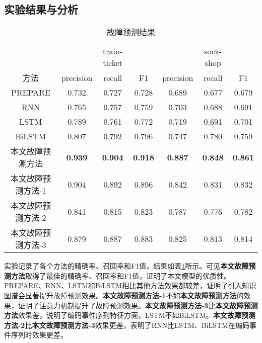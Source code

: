 \subsection{实验结果与分析}
\begin{table}[htbp]
    \caption{故障预测结果}
    \centering
    \label{anom-predict}
    \begin{tabular}{ccccccc}
    \toprule[2pt]
               &                & train-ticket   &                &                & sock-shop      &                \\
    方法         & precision      & recall         & F1             & precision      & recall         & F1             \\ \midrule[2pt]
    PREPARE    & 0.732          & 0.727          & 0.728          & 0.689          & 0.677          & 0.679          \\
    RNN        & 0.765          & 0.757          & 0.759          & 0.703          & 0.688          & 0.691          \\
    LSTM       & 0.789          & 0.761          & 0.772          & 0.719          & 0.691          & 0.701          \\
    BiLSTM     & 0.807          & 0.792          & 0.796          & 0.747          & 0.780          & 0.759          \\
    本文故障预测方法       & \textbf{0.939} & \textbf{0.904} & \textbf{0.918} & \textbf{0.887} & \textbf{0.848} & \textbf{0.861} \\
    本文故障预测方法-1 & 0.904          & 0.892          & 0.896          & 0.842          & 0.831          & 0.832          \\
    本文故障预测方法-2 & 0.841          & 0.815          & 0.823          & 0.787          & 0.776          & 0.782          \\
    本文故障预测方法-3 & 0.879          & 0.887          & 0.883          & 0.825          & 0.813          & 0.814          \\ \bottomrule[2pt]
    \end{tabular}
    \end{table}
实验记录了各个方法的精确率、召回率和F1值，结果如表\ref{anom-predict}所示。可见\textbf{本文故障预测方法}取得了最佳的精确率、召回率和F1值，证明了本文模型的优质性。PREPARE、RNN、LSTM和BiLSTM相比其他方法效果都较差，证明了引入知识图谱会显著提升故障预测效果。\textbf{本文故障预测方法-1}不如\textbf{本文故障预测方法}的效果，证明了注意力机制提升了故障预测效果。\textbf{本文故障预测方法-3}比\textbf{本文故障预测方法}效果差，说明了编码事件序列特征方面，LSTM不如BiLSTM。\textbf{本文故障预测方法-2}比\textbf{本文故障预测方法-3}效果更差，表明了RNN比LSTM、BiLSTM在编码事件序列时效果更差。

